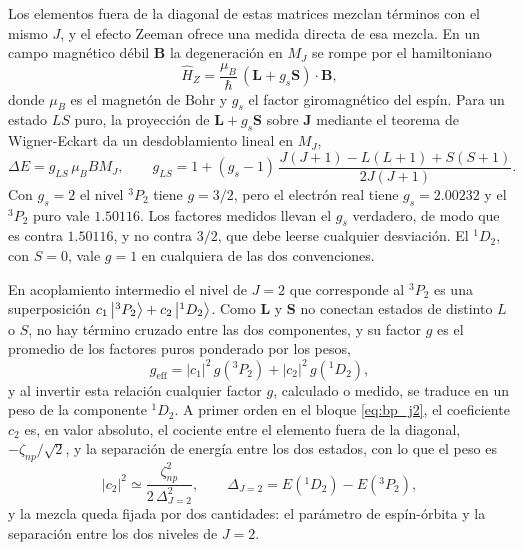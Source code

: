 Los elementos fuera de la diagonal de estas matrices mezclan términos con el mismo $J$, y el efecto Zeeman ofrece una medida directa de esa mezcla. En un campo magnético débil $\mathbf{B}$ la degeneración en $M_J$ se rompe por el hamiltoniano
\begin{equation}
    \hat{H}_Z = \frac{\mu_B}{\hbar}\,(\mathbf{L} + g_s\mathbf{S})\cdot\mathbf{B},
\end{equation}
donde $\mu_B$ es el magnetón de Bohr y $g_s$ el factor giromagnético del espín. Para un estado $LS$ puro, la proyección de $\mathbf{L} + g_s\mathbf{S}$ sobre $\mathbf{J}$ mediante el teorema de Wigner-Eckart \parencite[Complemento D\textsubscript{X}]{CohenTannoudji1977} da un desdoblamiento lineal en $M_J$,
\begin{equation}
    \label{eq:lande_g}
    \Delta E = g_{LS}\, \mu_B B M_J, \qquad g_{LS} = 1 + (g_s - 1)\,\frac{J(J+1) - L(L+1) + S(S+1)}{2J(J+1)}.
\end{equation}
Con $g_s = 2$ el nivel $^3P_2$ tiene $g = 3/2$, pero el electrón real tiene $g_s = 2.00232$ y el $^3P_2$ puro vale $1.50116$. Los factores medidos llevan el $g_s$ verdadero, de modo que es contra $1.50116$, y no contra $3/2$, que debe leerse cualquier desviación. El $^1D_2$, con $S=0$, vale $g = 1$ en cualquiera de las dos convenciones.

En acoplamiento intermedio el nivel de $J=2$ que corresponde al $^3P_2$ es una superposición $c_1\ket{^3P_2} + c_2\ket{^1D_2}$. Como $\mathbf{L}$ y $\mathbf{S}$ no conectan estados de distinto $L$ o $S$, no hay término cruzado entre las dos componentes, y su factor $g$ es el promedio de los factores puros ponderado por los pesos,
\begin{equation}
    \label{eq:g_efectivo}
    g_{\text{eff}} = |c_1|^2\, g(^3P_2) + |c_2|^2\, g(^1D_2),
\end{equation}
y al invertir esta relación cualquier factor $g$, calculado o medido, se traduce en un peso de la componente $^1D_2$. A primer orden en el bloque \eqref{eq:bp_j2}, el coeficiente $c_2$ es, en valor absoluto, el cociente entre el elemento fuera de la diagonal, $-\zeta_{np}/\sqrt{2}$, y la separación de energía entre los dos estados, con lo que el peso es
\begin{equation}
    \label{eq:mezcla_perturbativa}
    |c_2|^2 \simeq \frac{\zeta_{np}^2}{2\,\Delta_{J=2}^2}, \qquad \Delta_{J=2} = E(^1D_2) - E(^3P_2),
\end{equation}
y la mezcla queda fijada por dos cantidades: el parámetro de espín-órbita y la separación entre los dos niveles de $J=2$.

